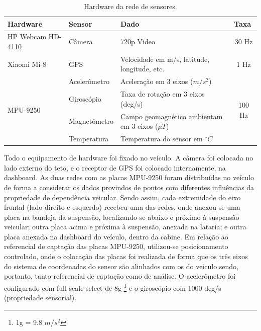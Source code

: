 \begin{table}[h!]
\small
\caption{Hardware da rede de sensores.} 
\label{table:sensor_network_hardware}
\centering
\begin{tabular}{llll}
\toprule
\multicolumn{1}{l}{\textbf{Hardware}} & 
\multicolumn{1}{l}{\textbf{Sensor}} & 
\multicolumn{1}{l}{\textbf{Dado}} & 
\multicolumn{1}{l}{\textbf{Taxa}}  
\\ \midrule

\multicolumn{1}{l}{HP Webcam HD-4110} & 
\multicolumn{1}{l}{Câmera} & 
\multicolumn{1}{l}{720p Video} & 
\multicolumn{1}{c}{30 Hz}                   
\\ \midrule

\multicolumn{1}{l}{Xiaomi Mi 8} & 
\multicolumn{1}{l}{GPS} & 
\multicolumn{1}{l}{Velocidade em m/s, latitude, longitude, etc.} &
\multicolumn{1}{c}{1 Hz}
\\ \midrule

\multicolumn{1}{l}{\multirow{5}{*}{MPU-9250}} & 
\multicolumn{1}{l}{Acelerômetro} & 
\multicolumn{1}{l}{Aceleração em 3 eixos ($m/s^2$)} &
\multicolumn{1}{c}{\multirow{5}{*}{100 Hz}} 
\\ \cmidrule(lr){2-3}

\multicolumn{1}{l}{} & 
\multicolumn{1}{l}{Giroscópio} & 
\multicolumn{1}{l}{Taxa de rotação em 3 eixos (deg/s)} & 
\multicolumn{1}{l}{}                       
\\ \cmidrule(lr){2-3}

\multicolumn{1}{l}{} & 
\multicolumn{1}{l}{Magnetômetro} & 
\multicolumn{1}{l}{Campo geomagnético ambientam em 3 eixos ($\mu T$)} & 
\multicolumn{1}{l}{}
\\ \cmidrule(lr){2-3}

\multicolumn{1}{l}{} & 
\multicolumn{1}{l}{Temperatura} &
\multicolumn{1}{l}{Temperatura do sensor em $^{\circ}C$} & 
\multicolumn{1}{l}{}                       
\\ \bottomrule

\end{tabular}
\end{table}

Todo o equipamento de hardware foi fixado no veículo. A câmera foi colocada no lado externo do teto, e o receptor de GPS foi colocado internamente, na dashboard. As duas redes com as placas MPU-9250 foram distribuídas no veículo de forma a considerar os dados provindos de pontos com diferentes influências da propriedade de dependência veicular. Sendo assim, cada extremidade do eixo frontal (lado direito e esquerdo) recebeu uma das redes, onde anexou-se uma placa na bandeja da suspensão, localizando-se abaixo e próximo à suspensão veicular; outra placa acima e próxima à suspensão, anexada na lataria; e outra placa anexada na dashboard do veículo, dentro da cabine. Em relação ao referencial de captação das placas MPU-9250, utilizou-se posicionamento controlado, onde o colocação das placas foi realizada de forma que os três eixos do sistema de coordenadas do sensor são alinhados com os do veículo sendo, portanto, tanto referencial de captação como de análise. O acelerômetro foi configurado com full scale select de 8g \footnote{1g = 9.8 $m/s^2$} e o giroscópio com 1000 deg/s (propriedade sensorial).

